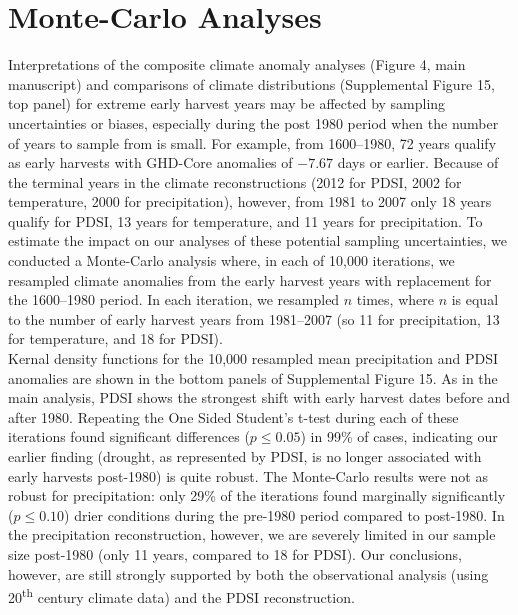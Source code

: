 \documentclass[12pt]{article}
\begin{document}
\section*{Monte-Carlo Analyses}
\noindent Interpretations of the composite climate anomaly analyses (Figure 4, main manuscript) and comparisons of climate distributions (Supplemental Figure 15, top panel) for extreme early harvest years may be affected by sampling uncertainties or biases, especially during the post 1980 period when the number of years to sample from is small. For example, from 1600--1980, 72 years qualify as early harvests with GHD-Core anomalies of $-7.67$ days or earlier. Because of the terminal years in the climate reconstructions (2012 for PDSI, 2002 for temperature, 2000 for precipitation), however, from 1981 to 2007 only 18 years qualify for PDSI, 13 years for temperature, and 11 years for precipitation. To estimate the impact on our analyses of these potential sampling uncertainties, we conducted a Monte-Carlo analysis where, in each of 10,000 iterations, we resampled climate anomalies from the early harvest years with replacement for the 1600--1980 period. In each iteration, we resampled $n$ times, where $n$ is equal to the number of early harvest years from 1981--2007 (so 11 for precipitation, 13 for temperature, and 18 for PDSI).\\
\indent Kernal density functions for the 10,000 resampled mean precipitation and PDSI anomalies are shown in the bottom panels of Supplemental Figure 15. As in the main analysis, PDSI shows the strongest shift with early harvest dates before and after 1980. Repeating the One Sided Student's t-test during each of these iterations found significant differences ($p\le0.05$) in 99\% of cases, indicating our earlier finding (drought, as represented by PDSI, is no longer associated with early harvests post-1980) is quite robust. The Monte-Carlo results were not as robust for precipitation: only 29\% of the iterations found marginally significantly ($p\le0.10$) drier conditions during the pre-1980 period compared to post-1980. In the precipitation reconstruction, however, we are severely limited in our sample size post-1980 (only 11 years, compared to 18 for PDSI). Our conclusions, however, are still strongly supported by both the observational analysis (using 20\textsuperscript{th} century climate data) and the PDSI reconstruction.
\end{document}
